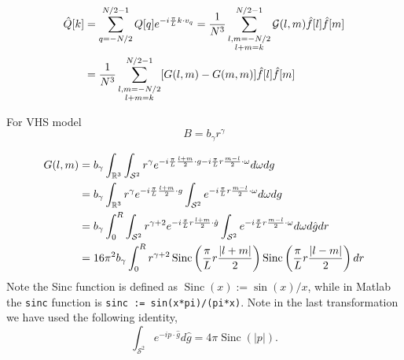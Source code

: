 \documentclass[11pt]{amsart}
\begin{document}
\color{blue}
\begin{align*}\begin{split}
\hat Q[k] &=  \sum_{q=-N/2}^{N/2-1} Q[q]e^{-i{\pi \over L}k\cdot v_q}=   \frac{1}{N^3} \sum_{\substack{l,m= -N/2 \\ l+m = k}}^{N/2-1}\mathcal{G}(l,m)\hat f[l] \hat f[m]  \\
&= \frac{1}{N^3} \sum_{\substack{l,m= -N/2 \\ l+m = k}}^{N/2-1} [G(l,m) - G(m,m)]\hat f[l] \hat f[m]
\end{split}\end{align*}
\color{black}

For VHS model
\begin{equation*}
B = b_\gamma r^{\gamma}
\end{equation*}

\begin{align*}
\begin{split}
G(l,m)  &= b_\gamma  \int_{\mathbb{R}^3} \int_{\mathcal{S}^2}  r^{\gamma}e^{-i{\pi \over L}\frac{l+m}{2} \cdot g -i {\pi \over L} r \frac{m-l}{2}\cdot \omega}d\omega dg \\
&= b_\gamma  \int_{\mathbb{R}^3}  r^{\gamma} e^{-i{\pi \over L}\frac{l+m}{2} \cdot g } \int_{\mathcal{S}^2} e^{-i {\pi \over L} r \frac{m-l}{2}\cdot \omega}d\omega dg \\
&= b_\gamma  \int_{0}^R\int_{\mathcal{S}^2}  r^{\gamma + 2} e^{-i{\pi \over L}r\frac{l+m}{2} \cdot \hat g }\int_{\mathcal{S}^2}    e^{-i {\pi \over L} r \frac{m-l}{2}\cdot \omega}d\omega d\hat g dr \\
& = 16 \pi^{2} b_{\gamma} \int_{0}^{R} r^{\gamma+2} \operatorname{Sinc}\left(\frac{\pi}{L} r \frac{|l+m|}{2}\right) \operatorname{Sinc}\left(\frac{\pi}{L} r \frac{|l-m|}{2}\right) d r
\end{split}
\end{align*}
Note the Sinc function is defined as $\operatorname{Sinc}(x) := \sin(x)/x$, while in Matlab the \verb|sinc| function is   \verb|sinc := sin(x*pi)/(pi*x)|. Note in the last transformation we have used the following identity,
\begin{equation*}
\int_{\mathcal{S}^2} e^{-i p \cdot \hat g} d \hat g = 4\pi \operatorname{Sinc}\left(\left\vert p \right\vert\right).
\end{equation*}
\end{document}
